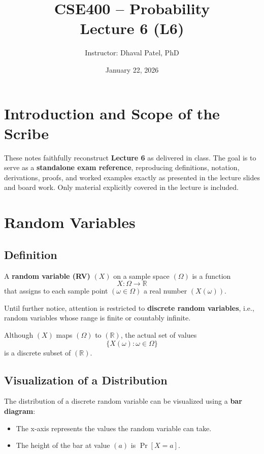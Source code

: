 \documentclass[11pt]{article}
\title{\textbf{CSE400 -- Probability}\\
Lecture 6 (L6)}
\author{Instructor: Dhaval Patel, PhD}
\date{January 22, 2026}
\begin{document}
\maketitle

\section{Introduction and Scope of the Scribe}

These notes faithfully reconstruct \textbf{Lecture 6} as delivered in class.
The goal is to serve as a \textbf{standalone exam reference}, reproducing
definitions, notation, derivations, proofs, and worked examples exactly as
presented in the lecture slides and board work.
Only material explicitly covered in the lecture is included.

\section{Random Variables}

\subsection{Definition}

A \textbf{random variable (RV)} $(X)$ on a sample space $(\Omega)$ is a function
\[
X : \Omega \to \mathbb{R}
\]
that assigns to each sample point $(\omega \in \Omega)$ a real number
$(X(\omega))$.

Until further notice, attention is restricted to \textbf{discrete random
variables}, i.e., random variables whose range is finite or countably infinite.

Although $(X)$ maps $(\Omega)$ to $(\mathbb{R})$, the actual set of values
\[
\{X(\omega) : \omega \in \Omega\}
\]
is a discrete subset of $(\mathbb{R})$.

\subsection{Visualization of a Distribution}

The distribution of a discrete random variable can be visualized using a
\textbf{bar diagram}:
\begin{itemize}
  \item The x-axis represents the values the random variable can take.
  \item The height of the bar at value $(a)$ is $\Pr[X = a]$.
\end{itemize}
\end{document}
